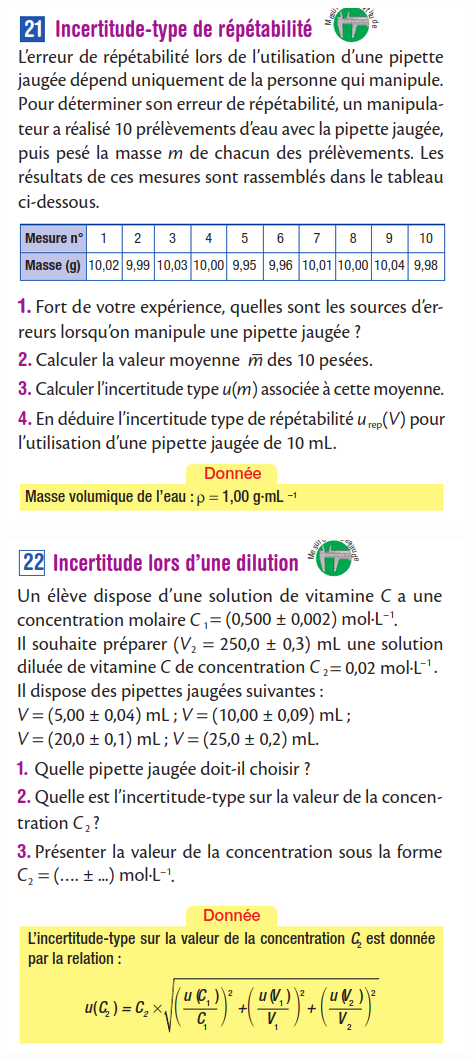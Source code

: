 \documentclass[10pt]{article}
\newcommand{\myscale}{0.41}
\begin{document}
\begin{center}
\begin{minipage}[c]{0.45\textwidth}
		\includegraphics[scale=\myscale]{assets/21.png}
	\end{minipage}
	\hspace{0.05\textwidth}
	\begin{minipage}[c]{0.45\textwidth}
		\centering
		\includegraphics[scale=\myscale]{assets/22.png}


\end{minipage}
\end{center}
\end{document}
